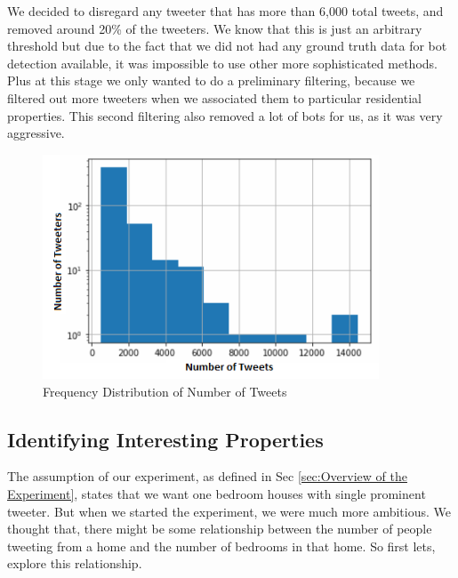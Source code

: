 \documentclass[12pt]{report}
\theoremstyle{named}
\begin{document}
We decided to disregard any tweeter that has more than 6,000 total tweets, and removed around 20\% of the tweeters. We know that this is just an arbitrary threshold but due to the fact that we did not had any ground truth data for bot detection available, it was impossible to use other more sophisticated methods. Plus at this stage we only wanted to do a preliminary filtering, because we filtered out more tweeters when we associated them to particular residential properties. This second filtering also removed a lot of bots for us, as it was very aggressive.
\begin{figure}[ht]
\centering
        \includegraphics[width=100mm,scale=1]{Images/TweeterDistribution.PNG}
    \caption{Frequency Distribution of Number of Tweets}
    \label{fig:TweeterDistribution}
\end{figure}



\subsection{Identifying Interesting Properties}
The assumption of our experiment, as defined in Sec \ref{sec:Overview of the Experiment}, states that we want one bedroom houses with single prominent tweeter. But when we started the experiment, we were much more ambitious. We thought that, there might be some relationship between the number of people tweeting from a home and the number of bedrooms in that home. So first lets, explore this relationship.
\end{document}
